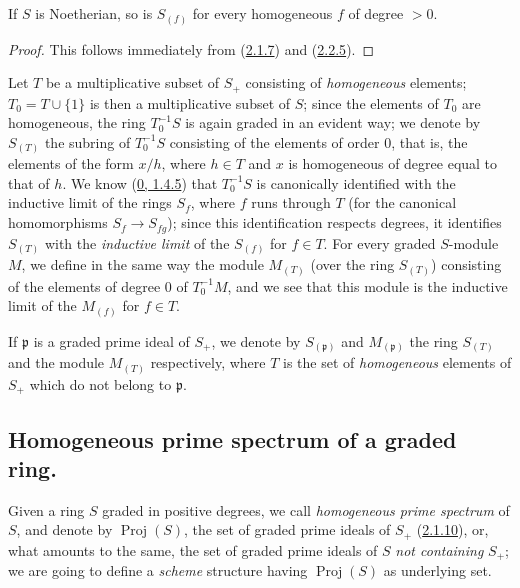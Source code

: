 \begin{corollary}[2.2.6]
\label{II.2.2.6}
If $S$ is Noetherian, so is $S_{(f)}$ for every homogeneous $f$
of degree $>0$.
\end{corollary}

\begin{proof}
This follows immediately from (\hyperref[II.2.1.7]{2.1.7}) and
(\hyperref[II.2.2.5]{2.2.5}).
\end{proof}

\begin{env}[2.2.7]
\label{II.2.2.7}
Let $T$ be a multiplicative subset of $S_+$ consisting of
\emph{homogeneous} elements; $T_0=T\cup\{1\}$ is then a multiplicative
subset of $S$; since the elements of $T_0$ are homogeneous, the ring
$T_0^{-1}S$ is again graded in an evident way; we denote by $S_{(T)}$ the
subring of $T_0^{-1}S$ consisting of the elements of order $0$, that is,
the elements of the form $x/h$, where $h\in T$ and $x$ is homogeneous of
degree equal to that of $h$. We know (\hyperref[0.1.4.5]{0, 1.4.5}) that
$T_0^{-1}S$ is canonically identified with the inductive limit of the rings
$S_f$, where $f$ runs through $T$ (for the canonical homomorphisms
$S_f\to S_{fg}$); since this identification respects degrees, it identifies
$S_{(T)}$ with the \emph{inductive limit} of the $S_{(f)}$ for $f\in T$.
For every graded $S$-module $M$, we define in the same way the module
$M_{(T)}$ (over the ring $S_{(T)}$) consisting of the elements of degree $0$
of $T_0^{-1}M$, and we see that this module is the inductive limit of the
$M_{(f)}$ for $f\in T$.

If $\mathfrak{p}$ is a graded prime ideal of $S_+$, we denote by
$S_{(\mathfrak{p})}$ and $M_{(\mathfrak{p})}$ the ring $S_{(T)}$ and the
module $M_{(T)}$ respectively, where $T$ is the set of \emph{homogeneous}
elements of $S_+$ which do not belong to $\mathfrak{p}$.
\end{env}

\subsection{Homogeneous prime spectrum of a graded ring.}
\label{subsection:II.2.3}

\begin{env}[2.3.1]
\label{II.2.3.1}
Given a ring $S$ graded in positive degrees, we call
\emph{homogeneous prime spectrum} of $S$, and denote by
$\operatorname{Proj}(S)$, the set of graded prime ideals of $S_+$
(\hyperref[II.2.1.10]{2.1.10}), or, what amounts to the same, the set
of graded prime ideals of $S$ \emph{not containing} $S_+$; we
are going to define a \emph{scheme} structure having
$\operatorname{Proj}(S)$ as underlying set.
\end{env}


